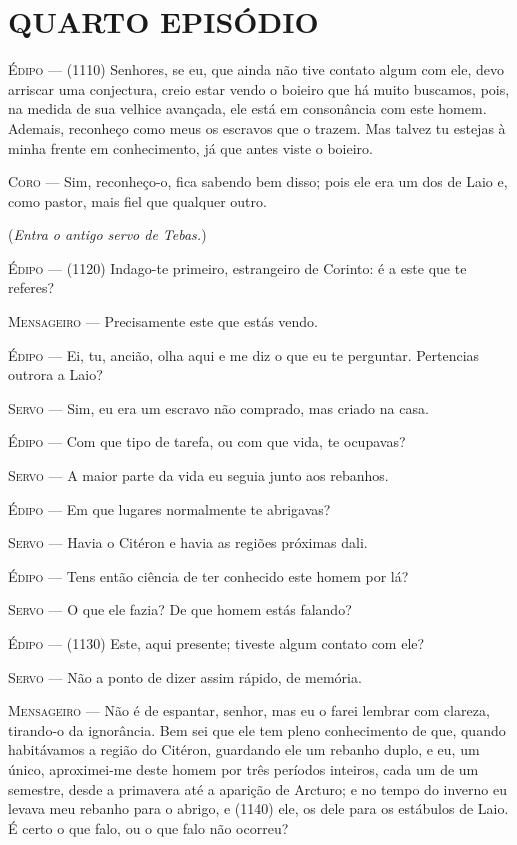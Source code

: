 \section{QUARTO EPISÓDIO}

\textsc{Édipo} --- (1110) Senhores, se eu, que ainda não tive contato algum com ele, devo
arriscar uma conjectura, creio estar vendo o boieiro que há muito
buscamos, pois, na medida de sua velhice avançada, ele está em
consonância com este homem. Ademais, reconheço como meus os escravos que
o trazem. Mas talvez tu estejas à minha frente em conhecimento, já que
antes viste o boieiro.

\textsc{Coro} --- Sim, reconheço-o, fica sabendo bem disso; pois ele era um dos de Laio e,
como pastor, mais fiel que qualquer outro.

(\emph{Entra o antigo servo de Tebas.})

\textsc{Édipo} --- (1120) Indago-te primeiro, estrangeiro de Corinto: é a este que te
referes?

\textsc{Mensageiro} --- Precisamente este que estás vendo.

\textsc{Édipo} --- Ei, tu, ancião, olha aqui e me diz o que eu te perguntar. Pertencias
outrora a Laio?

\textsc{Servo} --- Sim, eu era um escravo não comprado, mas criado na casa.

\textsc{Édipo} --- Com que tipo de tarefa, ou com que vida, te ocupavas?

\textsc{Servo} --- A maior parte da vida eu seguia junto aos rebanhos.

\textsc{Édipo} --- Em que lugares normalmente te abrigavas?

\textsc{Servo} --- Havia o Citéron e havia as regiões próximas dali.

\textsc{Édipo} --- Tens então ciência de ter conhecido este homem por lá?

\textsc{Servo} --- O que ele fazia? De que homem estás falando?

\textsc{Édipo} --- (1130) Este, aqui presente; tiveste algum contato com ele?

\textsc{Servo} --- Não a ponto de dizer assim rápido, de memória.

\textsc{Mensageiro} --- Não é de espantar, senhor, mas eu o farei lembrar com clareza, tirando-o
da ignorância. Bem sei que ele tem pleno conhecimento de que, quando
habitávamos a região do Citéron, guardando ele um rebanho duplo, e eu,
um único, aproximei-me deste homem por três períodos inteiros, cada um
de um semestre, desde a primavera até a aparição de Arcturo; e no tempo
do inverno eu levava meu rebanho para o abrigo, e (1140) ele, os dele
para os estábulos de Laio. É certo o que falo, ou o que falo não
ocorreu?

